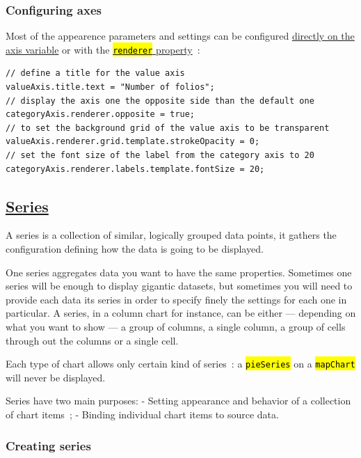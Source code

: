 \documentclass[a4paper,12pt,twoside]{book}
\let\OldTexttt\texttt
\renewcommand{\texttt}[1]{\OldTexttt{\hl{#1}}}
\begin{document}
				\subsubsection{Configuring axes}\label{configuring-axes}

Most of the appearence parameters and settings can be configured \href{https://www.amcharts.com/docs/v4/reference/axis/}{directly on the axis variable} or with the \href{https://www.amcharts.com/docs/v4/reference/axisrenderer/}{\texttt{renderer} property}~:

\begin{lstlisting}
// define a title for the value axis
valueAxis.title.text = "Number of folios";
// display the axis one the opposite side than the default one
categoryAxis.renderer.opposite = true;
// to set the background grid of the value axis to be transparent
valueAxis.renderer.grid.template.strokeOpacity = 0;
// set the font size of the label from the category axis to 20
categoryAxis.renderer.labels.template.fontSize = 20;
\end{lstlisting}

			\subsection{\href{https://www.amcharts.com/docs/v4/concepts/series/}{Series}}\label{series}

A series is a collection of similar, logically grouped data points, it gathers the configuration defining how the data is going to be displayed.

One series aggregates data you want to have the same properties. Sometimes one series will be enough to display gigantic datasets, but sometimes you will need to provide each data its series in order to specify finely the settings for each one in particular. A series, in a column chart for instance, can be either --- depending on what you want to show --- a group of columns, a single column, a group of cells through out the columns or a single cell.

Each type of chart allows only certain kind of series~: a \texttt{pieSeries} on a \texttt{mapChart} will never be displayed.

Series have two main purposes: - Setting appearance and behavior of a collection of chart items~; - Binding individual chart items to source data.

				\subsubsection{Creating series}\label{creating-series}
\end{document}
